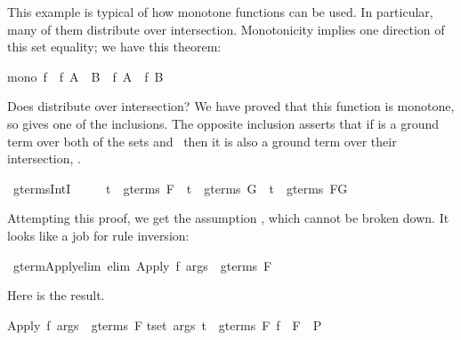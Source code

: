 \begin{isabellebody}
\begin{isamarkuptxt}
This example is typical of how monotone functions
 can be used.  In particular, many of them
distribute over intersection.  Monotonicity implies one direction of
this set equality; we have this theorem:
\begin{isabelle}%
mono\ f\ {\isasymLongrightarrow}\ f\ {\isacharparenleft}A\ {\isasyminter}\ B{\isacharparenright}\ {\isasymsubseteq}\ f\ A\ {\isasyminter}\ f\ B%
\end{isabelle}%
\end{isamarkuptxt}%
\isamarkuptrue%
%
\endisatagproof
{\isafoldproof}%
%
\isadelimproof
%
\endisadelimproof
%
\isamarkuptrue%
%
\begin{isamarkuptext}%
%
Does  distribute over intersection?  We have proved that this
function is monotone, so  gives one of the inclusions.  The
opposite inclusion asserts that if  is a ground term over both of the
sets
 and~ then it is also a ground term over their intersection,
.%
\end{isamarkuptext}%
\isamarkuptrue%
\isamarkupfalse%
\ gterms{\isacharunderscore}IntI{\isacharcolon}\isanewline
\ \ \ \ \ {\isachardoublequoteopen}t\ {\isasymin}\ gterms\ F\ {\isasymLongrightarrow}\ t\ {\isasymin}\ gterms\ G\ {\isasymlongrightarrow}\ t\ {\isasymin}\ gterms\ {\isacharparenleft}F{\isasyminter}G{\isacharparenright}{\isachardoublequoteclose}%
\isadelimproof
%
\endisadelimproof
%
\isatagproof
%
\endisatagproof
{\isafoldproof}%
%
\isadelimproof
%
\endisadelimproof
%
\begin{isamarkuptext}%
Attempting this proof, we get the assumption 
, which cannot be broken down. 
It looks like a job for rule inversion:%
\end{isamarkuptext}%
\isamarkuptrue%
\isamarkupfalse%
\ gterm{\isacharunderscore}Apply{\isacharunderscore}elim\ {\isacharbrackleft}elim{\isacharbang}{\isacharbrackright}{\isacharcolon}\ {\isachardoublequoteopen}Apply\ f\ args\ {\isasymin}\ gterms\ F{\isachardoublequoteclose}%
\begin{isamarkuptext}%
Here is the result.
\begin{isabelle}%
{\isasymlbrakk}Apply\ f\ args\ {\isasymin}\ gterms\ F{\isacharsemicolon}\isanewline
\isaindent{\ }{\isasymlbrakk}{\isasymforall}t{\isasymin}set\ args{\isachardot}\ t\ {\isasymin}\ gterms\ F{\isacharsemicolon}\ f\ {\isasymin}\ F{\isasymrbrakk}\ {\isasymLongrightarrow}\ P{\isasymrbrakk}\isanewline

\end{isabelle}
\end{isamarkuptext}
\end{isabellebody}
